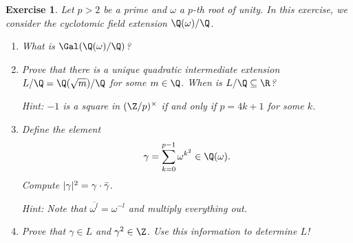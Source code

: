 \documentclass[a4paper,10pt,reqno]{amsart}
\newtheorem{ex}{Exercise}[section]
\begin{document}
\begin{ex}
\label{11.3}
Let $p > 2$ be a prime and $\omega$ a $p$-th root of unity. In this exercise, we consider the cyclotomic field extension $\Q(\omega)/\Q$. 
\begin{enumerate}[label=(\roman*)]
    \item What is $\Gal(\Q(\omega)/\Q)$?
    \item Prove that there is a unique quadratic intermediate extension $L/\Q = \Q(\sqrt{m})/\Q$ for some $m \in \Q$. When is $L/\Q \subseteq \R$?

    \noindent \textit{Hint:} $-1$ is a square in $(\Z/p)^{\times}$ if and only if $p = 4k+1$ for some $k$.
    \item Define the element
    \[
    \gamma = \sum_{k = 0}^{p-1}\omega^{k^2} \in \Q(\omega).
    \]
    Compute $|\gamma|^2 = \gamma \cdot \Bar{\gamma}$.

    \noindent \textit{Hint:} Note that $\overline{\omega^l} = \omega^{-l}$ and multiply everything out.
    \item Prove that $\gamma \in L$ and $\gamma^2 \in \Z$. Use this information to determine $L$!
\end{enumerate}
\end{ex}
\end{document}
